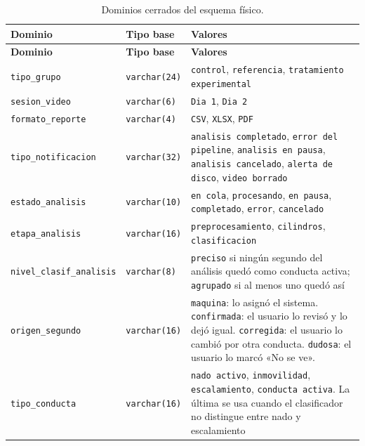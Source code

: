 {\footnotesize\singlespacing
\begin{longtable}{|>{\raggedright}p{3.4cm}|>{\raggedright}p{2.2cm}|>{\raggedright\arraybackslash}p{7.8cm}|}
\caption{Dominios cerrados del esquema físico.
\label{tab:dominios}}\\
\hline
\textbf{Dominio} & \textbf{Tipo base} & \textbf{Valores} \\
\hline
\endfirsthead
\hline
\textbf{Dominio} & \textbf{Tipo base} & \textbf{Valores} \\
\hline
\endhead
\texttt{tipo\_\allowbreak{}grupo} & \texttt{varchar(24)} & \texttt{control}, \texttt{referencia}, \texttt{tratamiento experimental} \\
\hline
\texttt{sesion\_\allowbreak{}video} & \texttt{varchar(6)} & \texttt{Dia 1}, \texttt{Dia 2} \\
\hline
\texttt{formato\_\allowbreak{}reporte} & \texttt{varchar(4)} & \texttt{CSV}, \texttt{XLSX}, \texttt{PDF} \\
\hline
\texttt{tipo\_\allowbreak{}notificacion} & \texttt{varchar(32)} & \texttt{analisis completado}, \texttt{error del pipeline}, \texttt{analisis en pausa}, \texttt{analisis cancelado}, \texttt{alerta de disco}, \texttt{video borrado} \\
\hline
\texttt{estado\_\allowbreak{}analisis} & \texttt{varchar(10)} & \texttt{en cola}, \texttt{procesando}, \texttt{en pausa}, \texttt{completado}, \texttt{error}, \texttt{cancelado} \\
\hline
\texttt{etapa\_\allowbreak{}analisis} & \texttt{varchar(16)} & \texttt{preprocesamiento}, \texttt{cilindros}, \texttt{clasificacion} \\
\hline
\texttt{nivel\_\allowbreak{}clasif\_\allowbreak{}analisis} & \texttt{varchar(8)} & \texttt{preciso} si ningún segundo del análisis quedó como conducta activa; \texttt{agrupado} si al menos uno quedó así \\
\hline
\texttt{origen\_\allowbreak{}segundo} & \texttt{varchar(16)} & \texttt{maquina}: lo asignó el sistema. \texttt{confirmada}: el usuario lo revisó y lo dejó igual. \texttt{corregida}: el usuario lo cambió por otra conducta. \texttt{dudosa}: el usuario lo marcó «No se ve». \\
\hline
\texttt{tipo\_\allowbreak{}conducta} & \texttt{varchar(16)} & \texttt{nado activo}, \texttt{inmovilidad}, \texttt{escalamiento}, \texttt{conducta activa}. La última se usa cuando el clasificador no distingue entre nado y escalamiento \\
\hline
\end{longtable}
}

